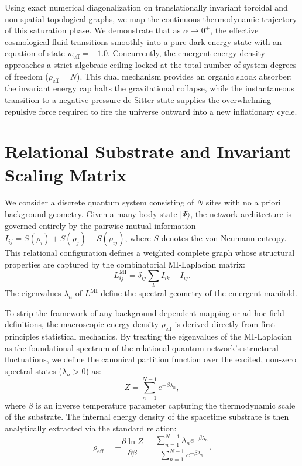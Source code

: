\documentclass[onecolumn,PRD,amsmath,amssymb,aps,nofootinbib,superscriptaddress,11pt]{revtex4-2}
\begin{document}
Using exact numerical diagonalization on translationally invariant toroidal and non-spatial topological graphs, we map the continuous thermodynamic trajectory of this saturation phase. We demonstrate that as $\alpha \to 0^+$, the effective cosmological fluid transitions smoothly into a pure dark energy state with an equation of state $w_{\text{eff}} = -1.0$. Concurrently, the emergent energy density approaches a strict algebraic ceiling locked at the total number of system degrees of freedom ($\rho_{\text{eff}} = N$). This dual mechanism provides an organic shock absorber: the invariant energy cap halts the gravitational collapse, while the instantaneous transition to a negative-pressure de Sitter state supplies the overwhelming repulsive force required to fire the universe outward into a new inflationary cycle.

\section{Relational Substrate and Invariant Scaling Matrix}
\label{sec:substrate}
We consider a discrete quantum system consisting of $N$ sites with no a priori background geometry. Given a many-body state $|\Psi\rangle$, the network architecture is governed entirely by the pairwise mutual information $I_{ij} = S(\rho_i) + S(\rho_j) - S(\rho_{ij})$, where $S$ denotes the von Neumann entropy. This relational configuration defines a weighted complete graph whose structural properties are captured by the combinatorial MI-Laplacian matrix:
\begin{equation}
L^{\text{MI}}_{ij} = \delta_{ij} \sum_{k} I_{ik} - I_{ij}.
\end{equation}
The eigenvalues $\lambda_n$ of $L^{\text{MI}}$ define the spectral geometry of the emergent manifold.

To strip the framework of any background-dependent mapping or ad-hoc field definitions, the macroscopic energy density $\rho_{\text{eff}}$ is derived directly from first-principles statistical mechanics. By treating the eigenvalues of the MI-Laplacian as the foundational spectrum of the relational quantum network's structural fluctuations, we define the canonical partition function over the excited, non-zero spectral states ($\lambda_n > 0$) as:
\begin{equation}
Z = \sum_{n=1}^{N-1} e^{-\beta \lambda_n},
\end{equation}
where $\beta$ is an inverse temperature parameter capturing the thermodynamic scale of the substrate. The internal energy density of the spacetime substrate is then analytically extracted via the standard relation:
\begin{equation}
\rho_{\text{eff}} = -\frac{\partial \ln Z}{\partial \beta} = \frac{\sum_{n=1}^{N-1} \lambda_n e^{-\beta \lambda_n}}{\sum_{n=1}^{N-1} e^{-\beta \lambda_n}}.
\end{equation}
\end{document}
